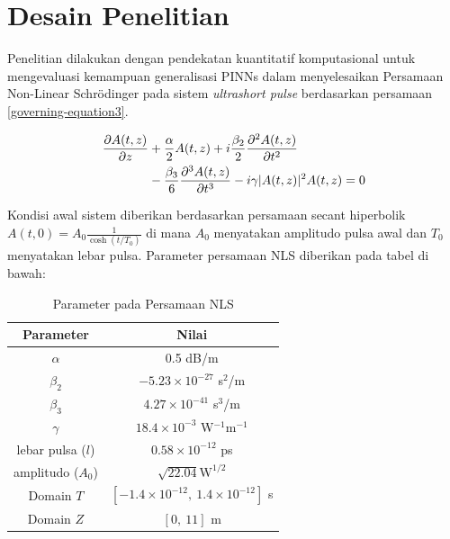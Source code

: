 \section{Desain Penelitian}
Penelitian dilakukan dengan pendekatan kuantitatif komputasional untuk mengevaluasi kemampuan generalisasi PINNs dalam menyelesaikan Persamaan Non-Linear Schr\"odinger pada sistem \emph{ultrashort pulse} berdasarkan persamaan \eqref{governing-equation3}.

\begin{align}
    \label{governing-equation3}
    \frac{\partial A(t,z)}{\partial z}
    &+ \frac{\alpha}{2} A(t,z) 
    + i \frac{\beta_2}{2} \frac{\partial^2 A(t,z)}{\partial t^2} \notag \\
    &-  \frac{\beta_3}{6} \frac{\partial^3 A(t,z)}{\partial t^3} 
    - i \gamma |A(t,z)|^2 A(t,z) 
    = 0
\end{align}

Kondisi awal sistem diberikan berdasarkan persamaan secant hiperbolik $A(t,0) = A_0 \frac{1}{\cosh(t/T_0)}$ di mana $A_0$ menyatakan amplitudo pulsa awal dan $T_0$ menyatakan lebar pulsa. Parameter persamaan NLS diberikan pada tabel di bawah:

\begin{table}[htbp]
    \centering
    \begin{threeparttable}
        \caption{Parameter pada Persamaan NLS}
        \label{TabelParam}
        \begin{tabular}{|c|c|}
            \hline
            \textbf{Parameter} & \textbf{Nilai} \\
            \hline
            $\alpha$ & 0.5 dB/m \\
            \hline
            $\beta_2$ & $-5.23 \times 10^{-27}$ s$^2$/m \\
            \hline
            $\beta_3$ & $4.27 \times 10^{-41}$ s$^3$/m \\
            \hline
            $\gamma$ & $18.4 \times 10^{-3}$ W$^{-1}$m$^{-1}$ \\
            \hline
            lebar pulsa ($l$) & $0.58 \times 10^{-12}$ ps \\
            \hline
            amplitudo ($A_0$) & $\sqrt{22.04} \text{W}^{1/2}$ \\
            \hline
            Domain $T$ & $[-1.4 \times 10^{-12},\ 1.4 \times 10^{-12}]$ s \\
            \hline
            Domain $Z$ & $[0,\ 11]$ m \\
            \hline
        \end{tabular}
    \end{threeparttable}
\end{table}

